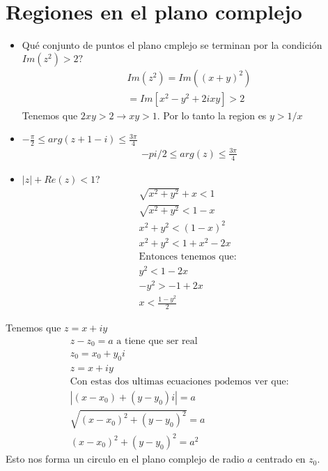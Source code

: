 \documentclass{article}
\newcommand{\caja}[3]{%
  \begin{tcolorbox}[colback=#1!5!white,colframe=#1!25!black,title=#2]
    #3
  \end{tcolorbox}%
}
\begin{document}
\section{Regiones en el plano complejo }
\caja{red}{Ejemplos }{
  \begin{itemize}
    \item { Qué conjunto de puntos el plano cmplejo se terminan por la condición $ Im(z^2) >2? $}
      \begin{gather}
        Im(z^2 ) = Im((x+y)^2 )\\
        = Im[x^2-y^2+ 2ixy ]>2 
        \label{eq:ej1}
      \end{gather}
      Tenemos que $ 2xy>2 \rightarrow xy>1  $. Por lo tanto la region es $ y>1/x $
    \item $ -\frac{\pi }{2} \leq arg(z+1-i)  \leq \frac{3\pi }{4}   $
      \begin{gather}
        -pi/2 \leq arg(z) \leq \frac{3\pi }{4}  
      \end{gather}
    \item $ |z| + Re(z)<1  $?
      \begin{gather}
        \sqrt{x^2+y^2 } +x <1 \\
        \sqrt{x^2+y^2 } < 1-x \\
        x^2+y^2 < (1-x)^2 \\
        x^2+y^2 < 1+x^2-2x \\
        \text{Entonces tenemos que: }\\
        y^2 < 1-2x \\
        -y^2 > -1+2x \\
        x < \frac{1-y^2 }{2 } 
        \label{eq:ej3 }
      \end{gather}
  \end{itemize}
}
\caja{red}{Curvas en el plano complejo }{
  Tenemos que $ z = x+iy  $ 
  \begin{gather}
    z-z_0 = a \text{  a tiene que ser real } \\
    z_0  = x_0 +y_0 i \\
    z = x+i y \\
    \text{Con estas dos ultimas ecuaciones podemos ver que: } \\
    |(x-x_0) + (y-y_0 )i | = a \\
    \sqrt{(x-x_0)^2 + (y-y_0)^2 }  = a \\
    (x-x_0)^2 +(y-y_0 ) ^2 = a^2 
  \end{gather}
  Esto nos forma un circulo en el plano complejo de radio $ a  $ centrado en $ z_0  $.
}
\end{document}
